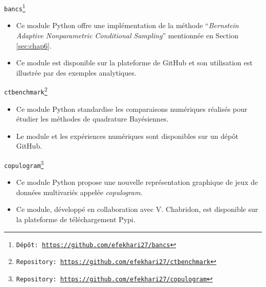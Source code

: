 \texttt{bancs\footnote{Dépôt: \url{https://github.com/efekhari27/bancs}}}     
\begin{itemize}
    \item[\textbullet] Ce module Python offre une implémentation de la méthode ``\textit{Bernstein Adaptive Nonparametric Conditional Sampling}'' mentionnée en Section \ref{sec:chap6}. 
    \item[\textbullet] Ce module est disponible sur la plateforme de GitHub et son utilisation est illustrée par des exemples analytiques.
\end{itemize}

\texttt{ctbenchmark\footnote{Repository: \url{https://github.com/efekhari27/ctbenchmark}}}    
\begin{itemize}
    \item[\textbullet] Ce module Python standardise les comparaisons numériques réalisés pour étudier les méthodes de quadrature Bayésiennes.      
    \item[\textbullet] Le module et les expériences numériques sont disponibles sur un dépôt GitHub.
\end{itemize}

\texttt{copulogram\footnote{Repository: \url{https://github.com/efekhari27/copulogram}}} 
\begin{itemize}
    \item[\textbullet] Ce module Python propose une nouvelle représentation graphique de jeux de données multivariés appelée \textit{copulogram}.
    \item[\textbullet] Ce module, développé en collaboration avec V. Chabridon, est disponible sur la plateforme de téléchargement Pypi.
\end{itemize}
